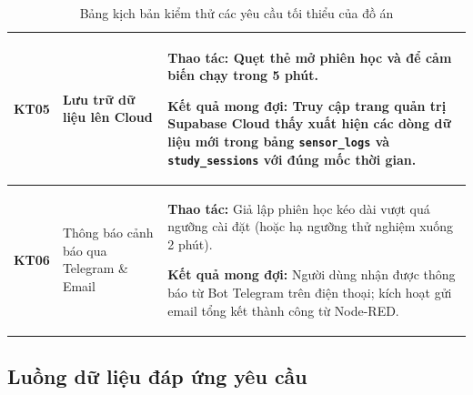 \begin{table}[htbp]
\begin{tabular}{|c|p{3.5cm}|p{9cm}|}
\textbf{KT05} & Lưu trữ dữ liệu lên Cloud & \textbf{Thao tác:} Quẹt thẻ mở phiên học và để cảm biến chạy trong 5 phút.\par\textbf{Kết quả mong đợi:} Truy cập trang quản trị Supabase Cloud thấy xuất hiện các dòng dữ liệu mới trong bảng \texttt{sensor\_logs} và \texttt{study\_sessions} với đúng mốc thời gian. \\ \hline

\textbf{KT06} & Thông báo cảnh báo qua Telegram \& Email & \textbf{Thao tác:} Giả lập phiên học kéo dài vượt quá ngưỡng cài đặt (hoặc hạ ngưỡng thử nghiệm xuống 2 phút).\par\textbf{Kết quả mong đợi:} Người dùng nhận được thông báo từ Bot Telegram trên điện thoại; kích hoạt gửi email tổng kết thành công từ Node-RED. \\ \hline
\end{tabular}
\caption{Bảng kịch bản kiểm thử các yêu cầu tối thiểu của đồ án}
\label{tab:kich_ban_kiem_thu}
\end{table}

\subsection{Luồng dữ liệu đáp ứng yêu cầu}

